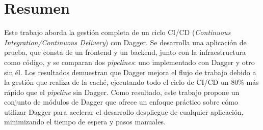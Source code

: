\pagestyle{plain}
\chapter*{Resumen}

Este trabajo aborda la gestión completa de un ciclo CI/CD (\textit{Continuous Integration/Continuous Delivery}) con Dagger. Se desarrolla una aplicación de prueba, que consta de un frontend y un backend, junto con la infraestructura como código, y se comparan dos \textit{pipelines}: uno implementado con Dagger y otro sin él. Los resultados demuestran que Dagger mejora el flujo de trabajo debido a la gestión que realiza de la caché, ejecutando todo el ciclo de CI/CD un 80\% más rápido que el \textit{pipeline} sin Dagger. Como resultado, este trabajo propone un conjunto de módulos de Dagger que ofrece un enfoque práctico sobre cómo utilizar Dagger para acelerar el desarrollo despliegue de cualquier aplicación, minimizando el tiempo de espera y pasos manuales.

